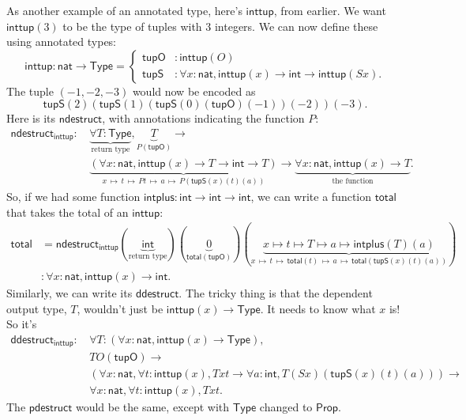 \documentclass[11pt,paper=letter]{scrartcl}
\renewcommand{\sf}{\mathsf}
\newcommand{\prop}{\mathsf{Prop}}
\newcommand{\type}{\mathsf{Type}}
\newcommand{\smapsto}{\,\mapsto\,}
\begin{document}
As another example of an annotated type, here's $\sf{inttup}$, from earlier. We want $\sf{inttup}(3)$ to be the type of tuples with $3$ integers. We can now define these using annotated types: \[
  \sf{inttup} : \sf{nat} \to \type = \begin{cases}
  \sf{tupO} &: \sf{inttup}(O) \\
  \sf{tupS} &: \forall x: \sf{nat}, \sf{inttup}(x) \to \sf{int} \to \sf{inttup}(Sx).
  \end{cases}
\]
The tuple $(-1, -2, -3)$ would now be encoded as \[
  \sf{tupS}(2)(\sf{tupS}(1)(\sf{tupS}(0)(\sf{tupO})(-1))(-2))(-3).
\]
Here is its $\sf{ndestruct}$, with annotations indicating the function $P$:
\begin{align*}
\sf{ndestruct}_\sf{inttup}:\,
&\underbrace{\forall T: \type}_{\text{return type}},
\underbrace{T}_{P(\sf{tupO})} \to\\
&\underbrace{(\forall x: \sf{nat}, \sf{inttup}(x) \to T \to \sf{int} \to T)}_{x\smapsto t \smapsto Pt \smapsto a \smapsto P(\sf{tupS}(x)(t)(a))} \to
\underbrace{\forall x: \sf{nat}, \sf{inttup}(x) \to T}_{\text{the function}}.
\end{align*}
So, if we had some function $\sf{intplus} : \sf{int} \to \sf{int} \to \sf{int}$, we can write a function $\sf{total}$ that takes the total of an $\sf{inttup}$:
\begin{align*}
\sf{total} &=
\sf{ndestruct}_\sf{inttup}
(\underbrace{\sf{int}}_{\text{return type}})
(\underbrace{0}_{\sf{total}(\sf{tupO})})
(\underbrace{x \mapsto t \mapsto T \mapsto a \mapsto \sf{intplus}(T)(a)}_{x\smapsto t \smapsto \sf{total}(t) \smapsto a \smapsto \sf{total}(\sf{tupS}(x)(t)(a))}) \\
&: \forall x: \sf{nat}, \sf{inttup}(x) \to \sf{int}.
\end{align*}
Similarly, we can write its $\sf{ddestruct}$. The tricky thing is that the dependent output type, $T$, wouldn't just be $\sf{inttup}(x) \to \type$. It needs to know what $x$ is! So it's
\begin{align*}
\sf{ddestruct}_\sf{inttup}:\,
& \forall T: (\forall x: \sf{nat}, \sf{inttup}(x) \to \type),\\
& TO(\sf{tupO}) \to \\
& (\forall x: \sf{nat}, \forall t: \sf{inttup}(x), Txt \to \forall a: \sf{int}, T(Sx)(\sf{tupS}(x)(t)(a))) \to \\
& \forall x: \sf{nat}, \forall t: \sf{inttup}(x), Txt.
\end{align*}
The $\sf{pdestruct}$ would be the same, except with $\type$ changed to $\prop$.
\end{document}
